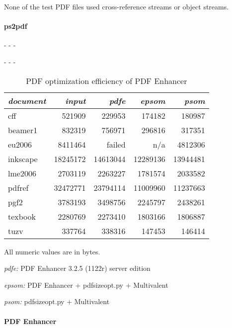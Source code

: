 \documentclass{ltugproc}
\def\cmd{\textsf}
\def\captiontop#1{%
  \advance\abovecaptionskip-\belowcaptionskip
  \advance\belowcaptionskip\abovecaptionskip
  \advance\abovecaptionskip-\belowcaptionskip
  \abovecaptionskip-\abovecaptionskip
  \caption{#1}%
  \advance\abovecaptionskip-\belowcaptionskip
  \advance\belowcaptionskip\abovecaptionskip
  \advance\abovecaptionskip-\belowcaptionskip
  \abovecaptionskip-\abovecaptionskip
}
\begin{document}
\noindent None of the test PDF files used cross-reference streams or object streams.

\paragraph{ps2pdf}


\begin{table}
\captiontop{PDF optimization efficiency
of PDF Enhancer}\label{tab:eff-pdfe}
\par\small\noindent\hfil
\advance\tabcolsep-2pt  %
\begin{tabular}{@{}lrrrr@{}}
\toprule
\emph{document} & \emph{input} & \emph{pdfe} & \emph{epsom} & \emph{psom} \\\midrule
cff         &   521909 &   229953 &   174182 &   180987 \\
beamer1     &   832319 &   756971 &   296816 &   317351 \\
eu2006      &  8411464 &  failed  & n/a      &  4812306 \\
inkscape    & 18245172 & 14613044 & 12289136 & 13944481 \\
lme2006     &  2703119 &  2263227 &  1781574 &  2033582 \\
pdfref      & 32472771 & 23794114 & 11009960 & 11237663 \\
pgf2        &  3783193 &  3498756 &  2245797 &  2438261 \\
texbook     &  2280769 &  2273410 &  1803166 &  1806887 \\
tuzv        &   337764 &   338316 &   147453 &   146414 \\
\bottomrule
\end{tabular}
\par\bigskip
\par\noindent All numeric values are in bytes.
\par\noindent\emph{pdfe:} PDF Enhancer 3.2.5 (1122r) server edition
\par\noindent\emph{epsom:} PDF Enhancer $+$ \cmd{pdfsizeopt.py} $+$ Multivalent
\par\noindent\emph{psom:} \cmd{pdfsizeopt.py} $+$ Multivalent
\end{table}


\paragraph{PDF Enhancer}
\end{document}
